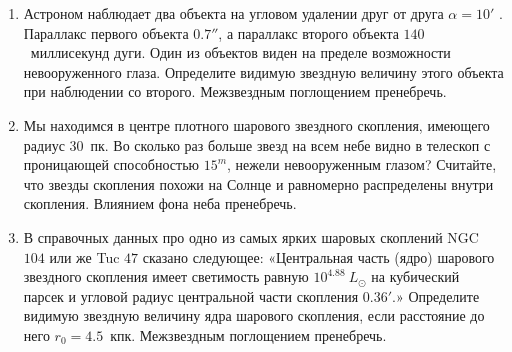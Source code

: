 \documentclass[12pt]{article}
\begin{document}
\begin{enumerate}
    \item Астроном наблюдает два объекта на угловом удалении друг от друга $\alpha=10'$ . Параллакс первого объекта $0.7''$, а параллакс второго объекта $140$~миллисекунд дуги. Один из объектов виден на пределе возможности невооруженного глаза. Определите видимую звездную величину этого объекта при наблюдении со второго. Межзвездным поглощением пренебречь. 
    \item Мы находимся в центре плотного шарового звездного скопления, имеющего радиус $30$~пк. Во сколько раз больше звезд на всем небе видно в телескоп с проницающей способностью $15^m$, нежели невооруженным глазом? Считайте, что звезды скопления похожи на Солнце и равномерно распределены внутри скопления. Влиянием фона неба пренебречь. 
    \item В справочных данных про одно из самых ярких шаровых скоплений NGC $104$ или же Tuc $47$ сказано следующее: «Центральная часть (ядро) шарового звездного скопления имеет светимость равную $10^{4.88}~L_{\odot}$ на кубический парсек и угловой радиус центральной части скопления $0.36'$.»
    Определите видимую звездную величину ядра шарового скопления, если расстояние до него $r_0=4.5$~кпк.
    Межзвездным поглощением пренебречь.
\end{enumerate}
\end{document}
